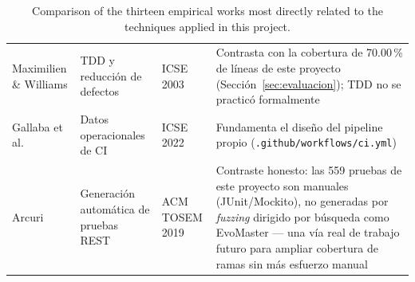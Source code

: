 \begin{table}[H]
\begin{tabular}{p{2.6cm}p{2cm}p{1.8cm}p{6.2cm}}
Maximilien \& Williams \cite{maximilien2003} & TDD y reducción de defectos & ICSE 2003 & Contrasta con la cobertura de 70.00\,\% de líneas de este proyecto (Sección~\ref{sec:evaluacion}); TDD no se practicó formalmente \\
Gallaba et al. \cite{gallaba2022} & Datos operacionales de CI & ICSE 2022 & Fundamenta el diseño del pipeline propio (\texttt{.github/workflows/ci.yml}) \\
Arcuri \cite{arcuri2019} & Generación automática de pruebas REST & ACM TOSEM 2019 & Contraste honesto: las 559 pruebas de este proyecto son manuales (JUnit/Mockito), no generadas por \textit{fuzzing} dirigido por búsqueda como EvoMaster --- una vía real de trabajo futuro para ampliar cobertura de ramas sin más esfuerzo manual \\
\bottomrule
\end{tabular}
\caption{Comparison of the thirteen empirical works most directly related to the techniques applied
in this project.}
\label{tab:trabajos-relacionados}
\end{table}
\newpage
